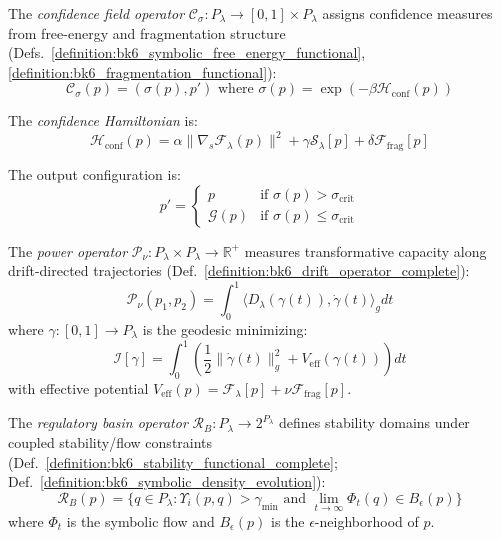 \begin{definition}
\label{definition:bk6_confidence_field_operator}
The \emph{confidence field operator} $\mathcal{C}_\sigma : P_\lambda \to [0,1] \times P_\lambda$ assigns confidence measures from free-energy and fragmentation structure (Defs.~\ref{definition:bk6_symbolic_free_energy_functional}, \ref{definition:bk6_fragmentation_functional}):
\begin{equation}
\mathcal{C}_\sigma(p) = (\sigma(p), p') \text{ where } \sigma(p) = \exp(-\beta \mathcal{H}_{\text{conf}}(p))
\end{equation}

The \emph{confidence Hamiltonian} is:
\begin{equation}
\mathcal{H}_{\text{conf}}(p) = \alpha \|\nabla_s \mathcal{F}_\lambda(p)\|^2 + \gamma \mathcal{S}_\lambda[p] + \delta \mathcal{F}_{\text{frag}}[p]
\end{equation}

The output configuration is:
\begin{equation}
p' = \begin{cases}
p & \text{if } \sigma(p) > \sigma_{\text{crit}} \\
\mathcal{G}(p) & \text{if } \sigma(p) \leq \sigma_{\text{crit}}
\end{cases}
\end{equation}
\end{definition}

\begin{definition}
\label{definition:bk6_power_operator}
The \emph{power operator} $\mathcal{P}_\nu : P_\lambda \times P_\lambda \to \mathbb{R}^+$ measures transformative capacity along drift-directed trajectories (Def.~\ref{definition:bk6_drift_operator_complete}):
\begin{equation}
\mathcal{P}_\nu(p_1, p_2) = \int_0^1 \langle D_\lambda(\gamma(t)), \dot{\gamma}(t) \rangle_g dt
\end{equation}
where $\gamma: [0,1] \to P_\lambda$ is the geodesic minimizing:
\begin{equation}
\mathcal{I}[\gamma] = \int_0^1 \left( \frac{1}{2}\|\dot{\gamma}(t)\|_g^2 + V_{\text{eff}}(\gamma(t)) \right) dt
\end{equation}
with effective potential $V_{\text{eff}}(p) = \mathcal{F}_\lambda[p] + \nu \mathcal{F}_{\text{frag}}[p]$.
\end{definition}

\begin{definition}
\label{definition:bk6_regulatory_basin_operator}
The \emph{regulatory basin operator} $\mathcal{R}_B : P_\lambda \to 2^{P_\lambda}$ defines stability domains under coupled stability/flow constraints (Def.~\ref{definition:bk6_stability_functional_complete}; Def.~\ref{definition:bk6_symbolic_density_evolution}):
\begin{equation}
\mathcal{R}_B(p) = \{q \in P_\lambda : \Upsilon_i(p,q) > \gamma_{\min} \text{ and } \lim_{t \to \infty} \Phi_t(q) \in B_\epsilon(p)\}
\end{equation}
where $\Phi_t$ is the symbolic flow and $B_\epsilon(p)$ is the $\epsilon$-neighborhood of $p$.
\end{definition}


